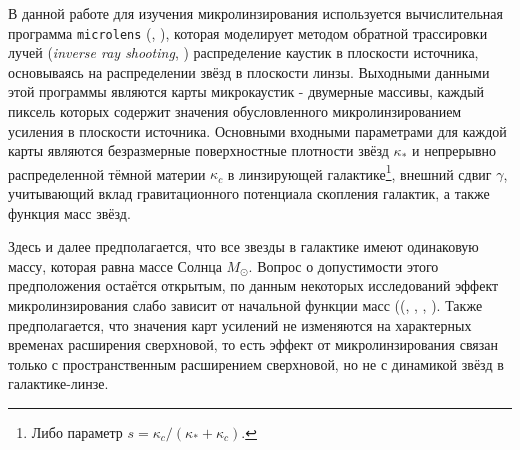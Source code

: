 В данной работе для изучения микролинзирования используется вычислительная программа {\tt{microlens}} (\cite{wambsganss1990-thesis}, \cite{wambsganss1999}), которая моделирует методом обратной трассировки лучей (\textit{inverse ray shooting}, \cite{kayserrefsdal1986}) распределение каустик в плоскости источника, основываясь на распределении звёзд в плоскости линзы. Выходными данными этой программы являются карты микрокаустик - двумерные массивы, каждый пиксель которых содержит значения обусловленного микролинзированием усиления в плоскости источника. Основными входными параметрами для каждой карты являются безразмерные поверхностные плотности звёзд $\kappa_*$ и непрерывно распределенной тёмной материи $\kappa_c$ в линзирующей галактике\footnote{Либо параметр $s=\kappa_c/(\kappa_*+\kappa_c)$.}, внешний сдвиг $\gamma$, учитывающий вклад гравитационного потенциала скопления галактик, а также функция масс звёзд. 




Здесь и далее предполагается, что все звезды в галактике имеют одинаковую массу, которая равна массе Солнца $M_{\odot}$. Вопрос о допустимости этого предположения остаётся открытым, по данным некоторых исследований эффект микролинзирования слабо зависит от начальной функции масс ((\cite{refsdalstabell1991}, \cite{doblerkeeton2006}, \cite{hubersuyu2019}, \cite{goldstein2018}). Также предполагается, что значения карт усилений не изменяются на характерных временах расширения сверхновой, то есть эффект от микролинзирования связан только с пространственным расширением сверхновой, но не с динамикой звёзд в галактике-линзе.

